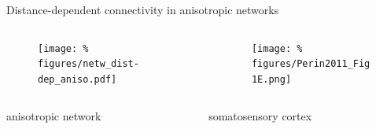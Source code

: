 \begin{frame}{Distance-dependent connectivity in anisotropic networks}
  \begin{columns}
    \begin{column}{.45\textwidth}
      \begin{figure}
        \centering
        \texttt{[image: \%
          figures/netw\_dist-dep\_aniso.pdf]} %
      \end{figure}


    \end{column}
    \begin{column}{.55\textwidth}
      \begin{figure}
        \centering
        \texttt{[image: \%
          figures/Perin2011\_Fig1E.png]} %
      \end{figure}

      
    \end{column}
  \end{columns}

  \vspace{0.95cm}

  \Large
  \begin{columns}
    \begin{column}{.45\textwidth}
      \minipage[c][0.15\textheight][s]{\columnwidth}
      \begin{center}
        anisotropic network
      \end{center}

      
      
      \endminipage      
    \end{column}
    \begin{column}{.55\textwidth}
      \minipage[c][0.15\textheight][s]{\columnwidth}
      \begin{center}
        somatosensory cortex\\ \textcite{Perin2011}
      \end{center}
            
      \endminipage           
    \end{column}
  \end{columns}

  
\end{frame}


